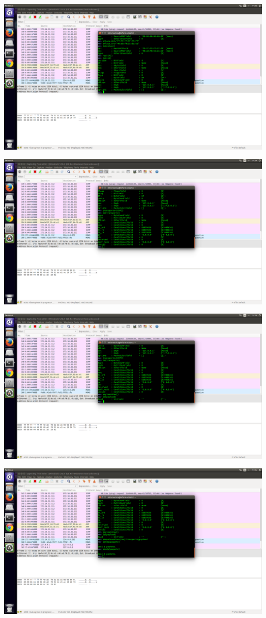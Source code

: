 \documentclass[spanish]{udpreport}
\begin{document}
\includegraphics[scale=0.2]{fotos/3.png}


\includegraphics[scale=0.2]{fotos/4.png}


\includegraphics[scale=0.2]{fotos/5.png}


\includegraphics[scale=0.2]{fotos/6.png}
\end{document}
